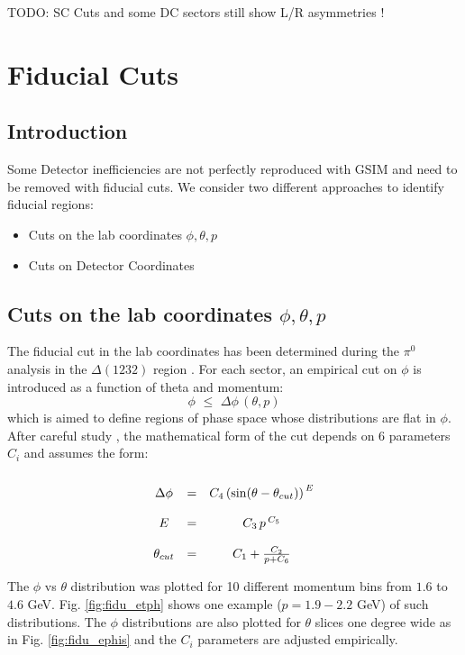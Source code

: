 
TODO: SC Cuts and some DC sectors still show L/R asymmetries !


\section{Fiducial Cuts}

\subsection{Introduction}

Some Detector inefficiencies are not perfectly reproduced with GSIM and need to be
removed with fiducial cuts. We consider two different approaches to identify fiducial regions:
\begin{itemize}
\item Cuts on the lab coordinates $\phi, \theta, p$
\item Cuts on Detector Coordinates
\end{itemize}



\subsection{Cuts on the lab coordinates $\phi, \theta, p$}
The fiducial cut in the lab coordinates has been determined during the $\pi^0$ analysis in
the $\Delta(1232)$ region \cite{bib:pi0_Delta}.
For each sector, an empirical cut on $\phi$ is introduced as a function of theta and momentum:
$$ 
 \phi \,\,\le\,\, \Delta\phi \,(\theta, p)
$$
which is aimed to define regions of phase space whose distributions are flat in $\phi$.
After careful study \cite{bib:fid_e}, the mathematical form of the cut depends on 6 parameters  $C_i$
and assumes the form:\vspace{-0.3 cm}
$$
\begin{array}{c c c}
\\
\Delta\phi   & = &  C_4 \left( \sin (\theta - \theta_{cut}) \right) ^{\,E} \\
\\
E        & = &  C_3\, p\, ^{C_5} \\
\\
\theta_{cut} & = &  C_1 + \frac{C_2}{p + C_6}
\end{array}
$$

The $\phi$ vs $\theta$ distribution was plotted for 10 different momentum bins from $1.6$ to $4.6$ GeV.
Fig. \ref{fig:fidu_etph} shows one example ($p=1.9-2.2$ GeV) of such distributions.
The $\phi$ distributions are also plotted for $\theta$ slices one degree wide as in Fig. \ref{fig:fidu_ephis}
and the $C_i$ parameters are adjusted empirically.


